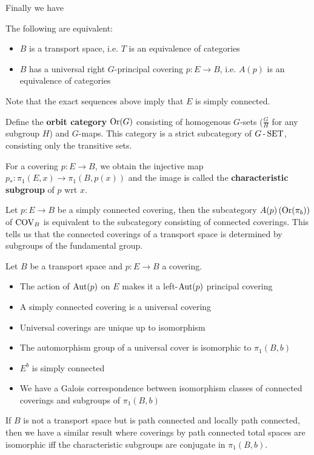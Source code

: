 Finally we have

\begin{thm*}
    The following are equivalent:
    \begin{itemize}
        \item $B$ is a transport space, i.e. $T$ is an equivalence of categories
        \item $B$ has a universal right $G$-principal covering $p:E\to B$, i.e. $A(p)$ is an equivalence of categories
    \end{itemize}
\end{thm*}

Note that the exact sequences above imply that $E$ is simply connected.

Define the \textbf{orbit category} $\operatorname{Or}(G)$ consisting of homogenous $G$-sets ($\frac GH$ for any subgroup $H$) and $G$-maps. This category is a strict subcategory of $G\operatorname{-}\operatorname{SET}$, consisting only the transitive sets.

For a covering $p:E\to B$, we obtain the injective map $p_*:\pi_1(E,x)\to\pi_1(B,p(x))$ and the image is called the \textbf{characteristic subgroup} of $p$ wrt $x$.

Let $p:E\to B$ be a simply connected covering, then the subcategory $A(p)\left(\operatorname{Or}(\pi_b)\right)$ of $\operatorname{COV}_B$ is equivalent to the subcategory consisting of connected coverings. This tells us that the connected coverings of a transport space is determined by subgroups of the fundamental group.

\begin{thm*}
    Let $B$ be a transport space and $p:E\to B$ a covering.
    \begin{itemize}
        \item The action of $\operatorname{Aut}(p)$ on $E$ makes it a left-$\operatorname{Aut}(p)$ principal covering
        \item A simply connected covering is a universal covering
        \item Universal coverings are unique up to isomorphism
        \item The automorphism group of a universal cover is isomorphic to $\pi_1(B,b)$
        \item $E^b$ is simply connected
        \item We have a Galois correspondence between isomorphism classes of connected coverings and subgroups of $\pi_1(B,b)$
    \end{itemize}
\end{thm*}


If $B$ is not a transport space but is path connected and locally path connected, then we have a similar result where coverings by path connected total spaces are isomorphic iff the characteristic subgroups are conjugate in $\pi_1(B,b)$.

